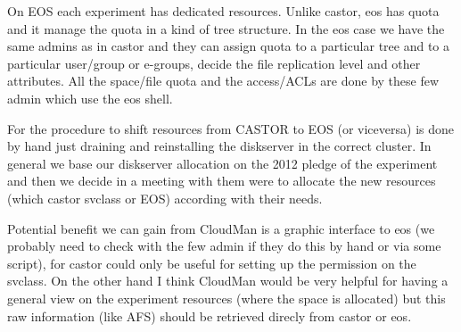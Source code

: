 On EOS each experiment has dedicated resources. Unlike castor, eos has quota and it manage the quota
in a kind of tree structure. In the eos case we have the same admins as in castor and they can assign quota to
a particular tree and to a particular user/group or e-groups, decide the file replication level and other attributes.
All the space/file quota and the access/ACLs are done by these few admin which use the eos shell.

For the procedure to shift resources from CASTOR to EOS (or viceversa) is done by hand just draining and reinstalling the diskserver in the correct cluster.
In general we base our diskserver allocation on the 2012 pledge of the experiment and then we decide in a meeting with them were to allocate the new resources (which castor svclass or EOS) according with their needs.


Potential benefit we can gain from CloudMan is a graphic interface to eos (we probably need to check with the few admin if they do this by hand or via some script), for castor could only be useful for setting up the permission on the svclass. On the other hand I think CloudMan would be very helpful for having a general view on the experiment resources (where the space is allocated) but this raw information (like AFS) should be retrieved direcly from castor or eos.

